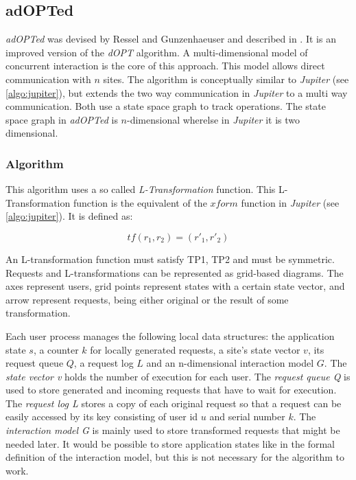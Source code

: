 \subsection{adOPTed}
\label{algo:adopted}

\emph{adOPTed} was devised by Ressel and Gunzenhaeuser and described in \cite{ressel96}. It is an improved version of the \emph{dOPT} algorithm. A multi-dimensional model of concurrent interaction is the core of this approach. This model allows direct communication with $n$ sites. The algorithm is conceptually similar to \emph{Jupiter} (see \ref{algo:jupiter}), but extends the two way communication in \emph{Jupiter} to a multi way communication. Both use a state space graph to track operations. The state space graph in \emph{adOPTed} is $n$-dimensional wherelse in \emph{Jupiter} it is two dimensional.


\subsubsection{Algorithm}
This algorithm uses a so called \emph{L-Transformation} function. This L-Transformation function is the equivalent of the $xform$ function in \emph{Jupiter} (see \ref{algo:jupiter}). It is defined as:

\label{algo:adopted:tf}
$$ tf(r_1,r_2) = (r'_1,r'_2) $$

An L-transformation function must satisfy TP1, TP2 and must be symmetric. Requests and L-transformations can be represented as grid-based diagrams. The axes represent users, grid points represent states with a certain state vector, and arrow represent requests, being either original or the result of some transformation.

Each user process manages the following local data structures: the application state $s$, a counter $k$ for locally generated requests, a site's state vector $v$, its request queue $Q$, a request log $L$ and an n-dimensional interaction model $G$. The \emph{state vector v} holds the number of execution for each user. The \emph{request queue Q} is used to store generated and incoming requests that have to wait for execution. The \emph{request log L} stores a copy of each original request so that a request can be easily accessed by its key consisting of user id $u$ and serial number $k$. The \emph{interaction model G} is mainly used to store transformed requests that might be needed later. It would be possible to store application states like in the formal definition of the interaction model, but this is not necessary for the algorithm to work.


